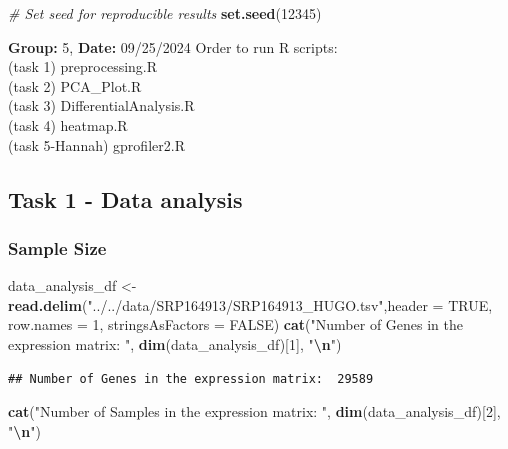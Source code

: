 \documentclass[
]{article}
\newenvironment{Shaded}{\begin{snugshade}}{\end{snugshade}}
\newcommand{\AttributeTok}[1]{\textcolor[rgb]{0.13,0.29,0.53}{#1}}
\newcommand{\CommentTok}[1]{\textcolor[rgb]{0.56,0.35,0.01}{\textit{#1}}}
\newcommand{\ConstantTok}[1]{\textcolor[rgb]{0.56,0.35,0.01}{#1}}
\newcommand{\DecValTok}[1]{\textcolor[rgb]{0.00,0.00,0.81}{#1}}
\newcommand{\FunctionTok}[1]{\textcolor[rgb]{0.13,0.29,0.53}{\textbf{#1}}}
\newcommand{\NormalTok}[1]{#1}
\newcommand{\OtherTok}[1]{\textcolor[rgb]{0.56,0.35,0.01}{#1}}
\newcommand{\SpecialCharTok}[1]{\textcolor[rgb]{0.81,0.36,0.00}{\textbf{#1}}}
\newcommand{\StringTok}[1]{\textcolor[rgb]{0.31,0.60,0.02}{#1}}
\begin{document}
\begin{Shaded}
\begin{Highlighting}[]
\CommentTok{\# Set seed for reproducible results}
\FunctionTok{set.seed}\NormalTok{(}\DecValTok{12345}\NormalTok{)}
\end{Highlighting}
\end{Shaded}

\textbf{Group:} 5, \textbf{Date:} 09/25/2024 Order to run R scripts:\\
(task 1) preprocessing.R\\
(task 2) PCA\_Plot.R\\
(task 3) DifferentialAnalysis.R\\
(task 4) heatmap.R\\
(task 5-Hannah) gprofiler2.R\\

\subsection{Task 1 - Data analysis}\label{task-1---data-analysis}

\subsubsection{Sample Size}\label{sample-size}

\begin{Shaded}
\begin{Highlighting}[]
\NormalTok{data\_analysis\_df }\OtherTok{\textless{}{-}} \FunctionTok{read.delim}\NormalTok{(}\StringTok{"../../data/SRP164913/SRP164913\_HUGO.tsv"}\NormalTok{,}\AttributeTok{header =} \ConstantTok{TRUE}\NormalTok{, }\AttributeTok{row.names =} \DecValTok{1}\NormalTok{, }\AttributeTok{stringsAsFactors =} \ConstantTok{FALSE}\NormalTok{)}
\FunctionTok{cat}\NormalTok{(}\StringTok{"Number of Genes in the expression matrix: "}\NormalTok{, }\FunctionTok{dim}\NormalTok{(data\_analysis\_df)[}\DecValTok{1}\NormalTok{], }\StringTok{"}\SpecialCharTok{\textbackslash{}n}\StringTok{"}\NormalTok{)}
\end{Highlighting}
\end{Shaded}

\begin{verbatim}
## Number of Genes in the expression matrix:  29589
\end{verbatim}

\begin{Shaded}
\begin{Highlighting}[]
\FunctionTok{cat}\NormalTok{(}\StringTok{"Number of Samples in the expression matrix: "}\NormalTok{, }\FunctionTok{dim}\NormalTok{(data\_analysis\_df)[}\DecValTok{2}\NormalTok{], }\StringTok{"}\SpecialCharTok{\textbackslash{}n}\StringTok{"}\NormalTok{)}
\end{Highlighting}
\end{Shaded}
\end{document}
